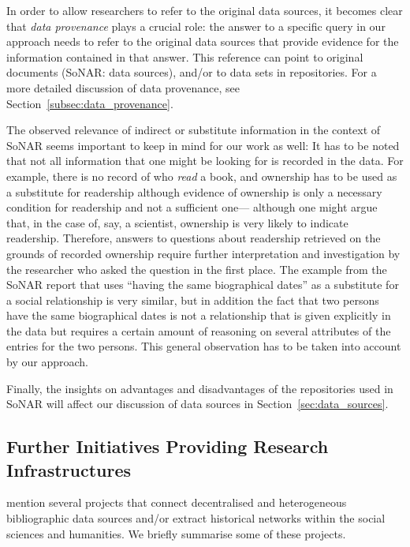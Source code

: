 In order to allow researchers to refer to the original data sources,
it becomes clear that \emph{data provenance} plays a crucial role:
the answer to a specific query in our approach needs to refer to
the original data sources that provide evidence for the information contained in that answer.
This reference can point to original documents (\gls{SoNAR}: data sources),
and/or to data sets in repositories. For a more detailed discussion of data provenance,
see Section~\ref{subsec:data_provenance}.

The observed relevance of indirect or substitute information in the context of \gls{SoNAR} 
seems important to keep in mind for our work as well: 
It has to be noted that not all information that one might be looking for is recorded
in the data. For example, there is no record of who \emph{read} a book,
and ownership has to be used as a substitute for readership although evidence
of ownership is only a necessary condition for readership and not a sufficient one---%
although one might argue that, in the case of, say, a scientist, ownership is very likely
to indicate readership.
Therefore, answers to questions
about readership retrieved on the grounds of recorded ownership require further interpretation and investigation
by the researcher who asked the question in the first place.
The example from the \gls{SoNAR} report that uses \enquote{having the same biographical dates}
as a substitute for a social relationship is very similar, but in addition
the fact that two persons have the same biographical dates is not a relationship that is
given explicitly in the data but requires a certain amount of reasoning on several attributes of the entries
for the two persons.
This general observation has to be taken into account by our approach.

Finally, the insights on advantages and disadvantages of the repositories used in \gls{SoNAR}
will affect our discussion of data sources in Section~\ref{sec:data_sources}.

\subsection{Further Initiatives Providing Research Infrastructures}

\textcite{Menzel2020} mention several projects that connect
decentralised and heterogeneous bibliographic data sources
and/or extract historical networks within the social sciences and humanities.
We briefly summarise some of these projects.

